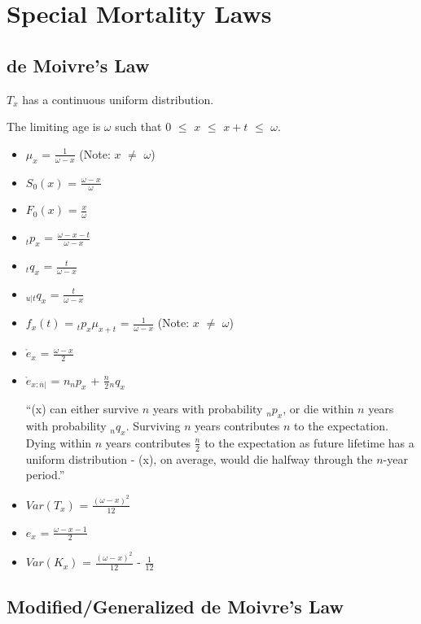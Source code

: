 \documentclass[]{book}
\begin{document}
\section{Special Mortality Laws}\label{special-mortality-laws}

\subsection{de Moivre's Law}\label{de-moivres-law}

\(T_x\) has a continuous uniform distribution.

The limiting age is \(\omega\) such that 0 \(\le\) \(x\) \(\le\)
\(x + t\) \(\le\) \(\omega\).

\begin{itemize}
\item
  \(\mu_x\) = \(\frac{1}{\omega - x}\) (Note: \(x\) \(\neq\) \(\omega\))
\item
  \(S_0(x)\) = \(\frac{\omega - x}{\omega}\)
\item
  \(F_0(x)\) = \(\frac{x}{\omega}\)
\item
  \({}_{t}p_x\) = \(\frac{\omega - x - t}{\omega - x}\)
\item
  \({}_{t}q_x\) = \(\frac{t}{\omega - x}\)
\item
  \({}_{u|t}q_x\) = \(\frac{t}{\omega - x}\)
\item
  \(f_x(t)\) = \({}_{t}p_x\)\(\mu_{x + t}\) = \(\frac{1}{\omega - x}\)
  (Note: \(x\) \(\neq\) \(\omega\))
\item
  \(\mathring{e}_x\) = \(\frac{\omega - x}{2}\)
\item
  \(\mathring{e}_{x :\overline{n}|}\) = \(n{}_{n}p_x\) +
  \(\frac{n}{2}{}_{n}q_x\)

  ``(x) can either survive \(n\) years with probability \({}_{n}p_x\),
  or die within \(n\) years with probability \({}_{n}q_x\). Surviving
  \(n\) years contributes \(n\) to the expectation. Dying within \(n\)
  years contributes \(\frac{n}{2}\) to the expectation as future
  lifetime has a uniform distribution - (x), on average, would die
  halfway through the \(n\)-year period.''
\item
  \(Var(T_x)\) = \(\frac{(\omega - x)^2}{12}\)
\item
  \(e_x\) = \(\frac{\omega - x - 1}{2}\)
\item
  \(Var(K_x)\) = \(\frac{(\omega - x)^2}{12}\) - \(\frac{1}{12}\)
\end{itemize}

\subsection{Modified/Generalized de Moivre's
Law}\label{modifiedgeneralized-de-moivres-law}
\end{document}
